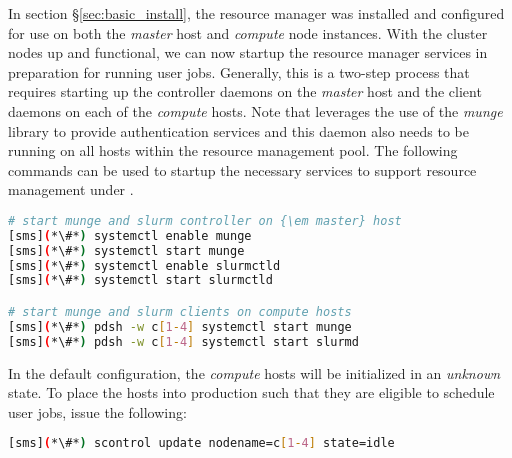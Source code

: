 In section \S\ref{sec:basic_install}, the \SLURM{} resource manager was installed
and configured for use on both the {\em master} host and {\em compute} node
instances. With the cluster nodes up and functional, we can now startup the
resource manager services in preparation for running user jobs. Generally, this
is a two-step process that requires starting up the controller daemons on the {\em
 master} host and the client daemons on each of the {\em compute} hosts.
Note that \SLURM{} leverages the use of the {\em munge} library to provide
authentication services and this daemon also needs to be running on all hosts
within the resource management pool. 
The following commands can be used to startup the necessary services to support
resource management under \SLURM{}.


\newpage
\begin{lstlisting}[language=bash]
# start munge and slurm controller on {\em master} host
[sms](*\#*) systemctl enable munge
[sms](*\#*) systemctl start munge
[sms](*\#*) systemctl enable slurmctld
[sms](*\#*) systemctl start slurmctld

# start munge and slurm clients on compute hosts
[sms](*\#*) pdsh -w c[1-4] systemctl start munge
[sms](*\#*) pdsh -w c[1-4] systemctl start slurmd
\end{lstlisting}

In the default configuration, the {\em compute} hosts will be initialized in an
{\em unknown} state. To place the hosts into production such that they are
eligible to schedule user jobs, issue the following:

\begin{lstlisting}[language=bash]
[sms](*\#*) scontrol update nodename=c[1-4] state=idle
\end{lstlisting}



